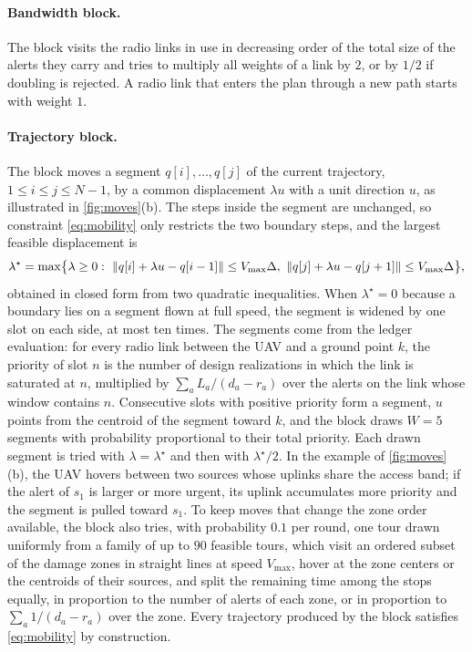 \paragraph{Bandwidth block.} The block visits the radio links in use in decreasing order of the total size of the alerts they carry and tries to multiply all weights of a link by $2$, or by $1/2$ if doubling is rejected. A radio link that enters the plan through a new path starts with weight $1$.

\paragraph{Trajectory block.} The block moves a segment $q[i],\dots,q[j]$ of the current trajectory, $1\le i\le j\le N-1$, by a common displacement $\lambda u$ with a unit direction $u$, as illustrated in \cref{fig:moves}(b). The steps inside the segment are unchanged, so constraint \eqref{eq:mobility} only restricts the two boundary steps, and the largest feasible displacement is
\begin{equation}
\label{eq:shift}
\lambda^\star=\max\bigl\{\lambda\ge 0:\ \lVert q[i]+\lambda u-q[i-1]\rVert\le V_{\max}\Delta,\ \lVert q[j]+\lambda u-q[j+1]\rVert\le V_{\max}\Delta\bigr\},
\end{equation}
\noindent obtained in closed form from two quadratic inequalities. When $\lambda^\star=0$ because a boundary lies on a segment flown at full speed, the segment is widened by one slot on each side, at most ten times. The segments come from the ledger evaluation: for every radio link between the UAV and a ground point $k$, the priority of slot $n$ is the number of design realizations in which the link is saturated at $n$, multiplied by $\sum_a L_a/(d_a-r_a)$ over the alerts on the link whose window contains $n$. Consecutive slots with positive priority form a segment, $u$ points from the centroid of the segment toward $k$, and the block draws $W=5$ segments with probability proportional to their total priority. Each drawn segment is tried with $\lambda=\lambda^\star$ and then with $\lambda^\star/2$. In the example of \cref{fig:moves}(b), the UAV hovers between two sources whose uplinks share the access band; if the alert of $s_1$ is larger or more urgent, its uplink accumulates more priority and the segment is pulled toward $s_1$. To keep moves that change the zone order available, the block also tries, with probability $0.1$ per round, one tour drawn uniformly from a family of up to $90$ feasible tours, which visit an ordered subset of the damage zones in straight lines at speed $V_{\max}$, hover at the zone centers or the centroids of their sources, and split the remaining time among the stops equally, in proportion to the number of alerts of each zone, or in proportion to $\sum_a 1/(d_a-r_a)$ over the zone. Every trajectory produced by the block satisfies \eqref{eq:mobility} by construction.

